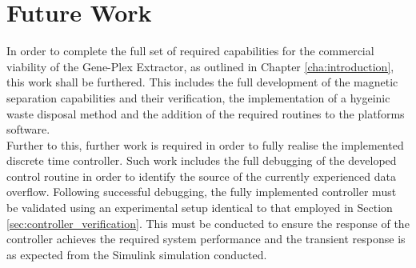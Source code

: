 \chapter{Future Work}
\label{cha:futurework}

In order to complete the full set of required capabilities for the commercial viability of the Gene-Plex Extractor, as outlined in Chapter \ref{cha:introduction}, this work shall be furthered. This includes the full development of the magnetic separation capabilities and their verification, the implementation of a hygeinic waste disposal method and the addition of the required routines to the platforms software.\\

Further to this, further work is required in order to fully realise the implemented discrete time controller. Such work includes the full debugging of the developed control routine in order to identify the source of the currently experienced data overflow. Following successful debugging, the fully implemented controller must be validated using an experimental setup identical to that employed in Section \ref{sec:controller_verification}. This must be conducted to ensure the response of the controller achieves the required system performance and the transient response is as expected from the Simulink simulation conducted.